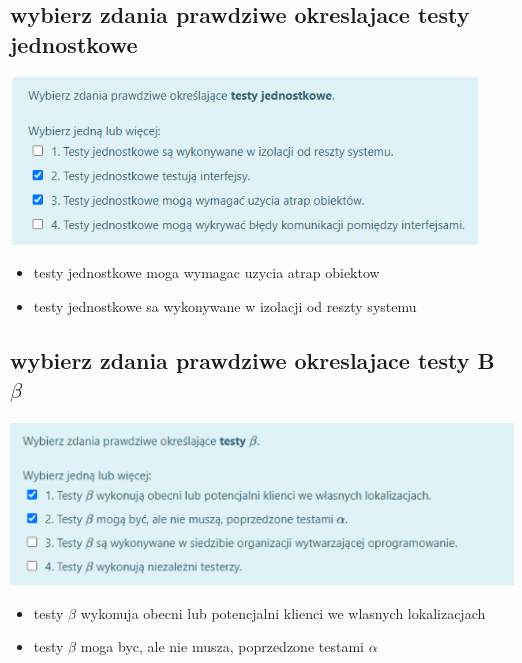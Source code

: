 \documentclass[11pt]{article}
\begin{document}
\subsection{wybierz zdania prawdziwe okreslajace testy jednostkowe}
\label{sec:org2402bca}
\begin{center}
\includegraphics[width=.9\linewidth]{./zadanie4.png}
\end{center}
\begin{itemize}
\item testy jednostkowe moga wymagac uzycia atrap obiektow
\item testy jednostkowe sa wykonywane w izolacji od reszty systemu
\end{itemize}
\subsection{wybierz zdania prawdziwe okreslajace testy B  \(\beta\)}
\label{sec:org7d12b6f}
\begin{center}
\includegraphics[width=.9\linewidth]{./zadanie5.png}
\end{center}
\begin{itemize}
\item testy \(\beta\) wykonuja obecni lub potencjalni klienci we wlasnych lokalizacjach
\item testy \(\beta\) moga byc, ale nie musza, poprzedzone testami \(\alpha\)
\end{itemize}
\end{document}
